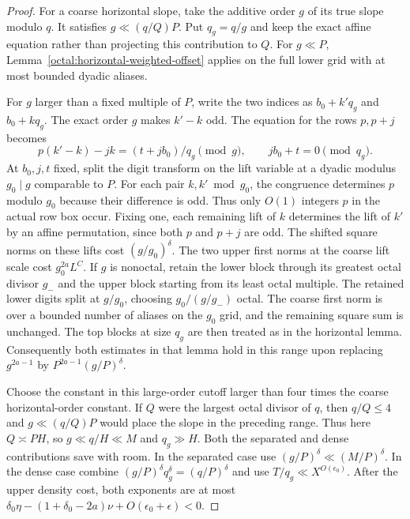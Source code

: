 \documentclass[11pt,a4paper]{article}
\theoremstyle{paperplain}
\numberwithin{equation}{section}
\begin{document}
\begin{proof}
For a coarse horizontal slope, take the additive order $g$
of its true slope modulo $q$. It satisfies $g\ll(q/Q)P$.
Put $q_g=q/g$ and keep the exact affine equation rather than
projecting this contribution to $Q$. For $g\ll P$,
Lemma~\ref{octal:horizontal-weighted-offset} applies on the
full lower grid with at most bounded dyadic aliases.

For $g$ larger than a fixed multiple of $P$, write the two
indices as $b_0+k' q_g$ and $b_0+k q_g$. The exact order $g$
makes $k'-k$ odd. The equation for the rows $p,p+j$ becomes
\begin{equation}\label{eq:near-balanced-affine-true-order}
      p(k'-k)-j k=(t+j b_0)/q_g\pmod g,
               \qquad jb_0+t=0\pmod{q_g}.
\end{equation}
At $b_0,j,t$ fixed, split the digit transform on the lift
variable at a dyadic modulus $g_0\mid g$ comparable to $P$.
For each pair $k,k'\bmod g_0$, the congruence determines $p$
modulo $g_0$ because their difference is odd. Thus only
$O(1)$ integers $p$ in the actual row box occur. Fixing one,
each remaining lift of $k$ determines the lift of $k'$ by
an affine permutation, since both $p$ and $p+j$ are odd.
The shifted square norms on these lifts cost $(g/g_0)^\delta$.
The two upper first norms at the coarse lift scale cost
$g_0^{2a}L^C$. If $g$ is nonoctal, retain the lower block
through its greatest octal divisor $g_-$ and the upper block
starting from its least octal multiple. The retained lower
digits split at $g/g_0$, choosing $g_0/(g/g_-)$ octal.
The coarse first norm is over a bounded number of aliases
on the $g_0$ grid, and the remaining square sum is unchanged.
The top blocks at size $q_g$ are then treated as in the
horizontal lemma. Consequently both estimates in that lemma
hold in this range upon replacing $g^{2a-1}$ by
$P^{2a-1}(g/P)^\delta$.

Choose the constant in this large-order cutoff larger than four
times the coarse horizontal-order constant. If $Q$ were the largest
octal divisor of $q$, then $q/Q\le4$ and $g\ll(q/Q)P$ would place
the slope in the preceding range. Thus here $Q\asymp PH$, so
$g\ll q/H\ll M$ and $q_g\gg H$. Both the separated and
dense contributions save with room. In the separated case
use $(g/P)^\delta\ll(M/P)^\delta$. In the dense case
combine $(g/P)^\delta q_g^\delta=(q/P)^\delta$ and use
$T/q_g\ll X^{O(\epsilon_0)}$. After the upper density cost,
both exponents are at most
$\delta_0\eta-(1+\delta_0-2a)\nu+O(\epsilon_0+\epsilon)<0$.


\end{proof}
\end{document}
